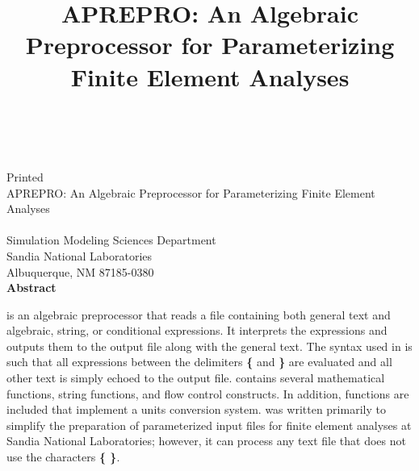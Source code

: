 \newif\ifdraft\draftfalse
\newif\ifsand\sandtrue

\SANDprintDate{\today}
\newcommand{\theTitle}{APREPRO: An Algebraic Preprocessor for Parameterizing Finite Element Analyses}
\title{\theTitle}
\ifsand
{}
\doCover
\newpage
\else
\SANDmarks{cover}
\setcounter{page}{3}
\fi


\begin{center}
\SANDnumVar\\
\SANDreleaseTypeVar\\
\ifdraft
Draft Date: \SANDprintDateVar\\
\else
Printed \SANDprintDateVar\\
\fi

\vspace{0.75in}
\theTitle\\
\vspace{0.75in}
\SANDauthorVar\\
Simulation Modeling Sciences Department\\
Sandia National Laboratories\\
Albuquerque, NM 87185-0380\\
\vspace*{.5in}
\textbf{Abstract}
\end{center}
\vspace{-.4cm}\par

\aprepro{} is an algebraic preprocessor that reads a file containing both
general\textit{ }text and algebraic, string, or conditional expressions. It interprets
the expressions and outputs them to the output file along with the general text.
The syntax used in \aprepro{} is such that all expressions between the delimiters
\textbf{\{} and \textbf{\}} are evaluated and all other text is simply echoed to
the output file. \aprepro{} contains several mathematical functions,
string functions, and flow control constructs. In addition, functions
are included that implement a units conversion system. \aprepro{} was
written primarily to simplify the preparation of parameterized input
files for finite element analyses at Sandia National Laboratories;
however, it can process any text file that does not use the characters
\textbf{\{ \}}.\newpage


